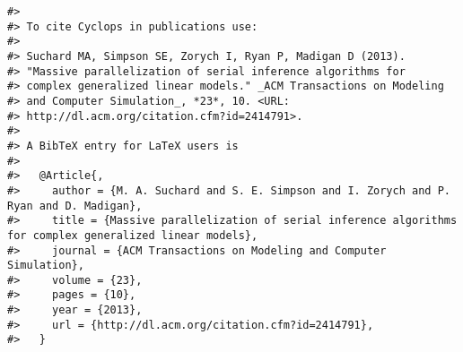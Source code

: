 \documentclass[]{article}
\begin{document}
\begin{verbatim}
#> 
#> To cite Cyclops in publications use:
#> 
#> Suchard MA, Simpson SE, Zorych I, Ryan P, Madigan D (2013).
#> "Massive parallelization of serial inference algorithms for
#> complex generalized linear models." _ACM Transactions on Modeling
#> and Computer Simulation_, *23*, 10. <URL:
#> http://dl.acm.org/citation.cfm?id=2414791>.
#> 
#> A BibTeX entry for LaTeX users is
#> 
#>   @Article{,
#>     author = {M. A. Suchard and S. E. Simpson and I. Zorych and P. Ryan and D. Madigan},
#>     title = {Massive parallelization of serial inference algorithms for complex generalized linear models},
#>     journal = {ACM Transactions on Modeling and Computer Simulation},
#>     volume = {23},
#>     pages = {10},
#>     year = {2013},
#>     url = {http://dl.acm.org/citation.cfm?id=2414791},
#>   }
\end{verbatim}
\end{document}
